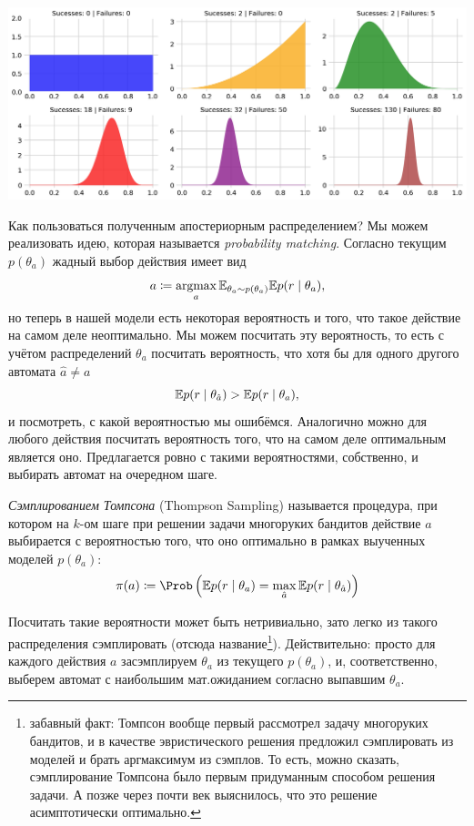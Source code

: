 \begin{example}
\begin{center}
    \includegraphics[width=\textwidth]{Images/TS}
\end{center}
\end{example}

Как пользоваться полученным апостериорным распределением? Мы можем реализовать идею, которая называется \emph{probability matching}. Согласно текущим $p(\theta_a)$ жадный выбор действия имеет вид
$$a \HM\coloneqq \argmax_a \E_{\theta_a \sim p(\theta_a)} \E p(r \mid \theta_a),$$
но теперь в нашей модели есть некоторая вероятность и того, что такое действие на самом деле неоптимально. Мы можем посчитать эту вероятность, то есть с учётом распределений $\theta_a$ посчитать вероятность, что хотя бы для одного другого автомата $\hat{a} \ne a$
$$\mathbb{E} p(r \mid \theta_{\hat{a}}) > \mathbb{E} p(r \mid \theta_{a}),$$
и посмотреть, с какой вероятностью мы ошибёмся. Аналогично можно для любого действия посчитать вероятность того, что на самом деле оптимальным является оно. Предлагается ровно с такими вероятностями, собственно, и выбирать автомат на очередном шаге.

\begin{definition}
\emph{Сэмплированием Томпсона} (Thompson Sampling) называется процедура, при котором на $k$-ом шаге при решении задачи многоруких бандитов действие $a$ выбирается с вероятностью того, что оно оптимально в рамках выученных моделей $p(\theta_a)$:
$$\pi(a) \coloneqq \Prob \left( \E p(r \mid \theta_a) = \max_{\hat{a}} \E p(r \mid \theta_{\hat{a}}) \right)$$
\end{definition}

Посчитать такие вероятности может быть нетривиально, зато легко из такого распределения сэмплировать (отсюда название\footnote{забавный факт: Томпсон вообще первый рассмотрел задачу многоруких бандитов, и в качестве эвристического решения предложил сэмплировать из моделей и брать аргмаксимум из сэмплов. То есть, можно сказать, сэмплирование Томпсона было первым придуманным способом решения задачи. А позже через почти век выяснилось, что это решение асимптотически оптимально.}). Действительно: просто для каждого действия $a$ засэмплируем $\theta_a$ из текущего $p(\theta_a)$, и, соответственно, выберем автомат с наибольшим мат.ожиданием согласно выпавшим $\theta_a$. 

